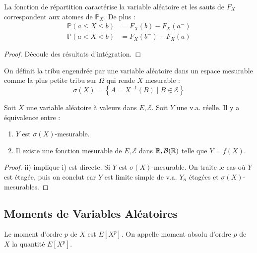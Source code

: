 \documentclass{cours}
\begin{document}
\begin{proposition}
    La fonction de répartition caractérise la variable aléatoire et les sauts de $F_{X}$ correspondent aux atomes de $\mathbb{P}_{X}$. De plus :
    \[
        \begin{aligned}
            \mathbb{P}\left(a \leq X \leq b\right) & = F_{X}(b) - F_{X}(a^{-}) \\
            \mathbb{P}\left(a < X < b\right)       & = F_{X}(b^{-}) - F_{X}(a)
        \end{aligned}
    \]
\end{proposition}
\begin{proof}
    Découle des résultats d'intégration.
\end{proof}

\begin{definition}
    On définit la tribu engendrée par une variable aléatoire dans un espace mesurable comme la plus petite tribu sur $\Omega$ qui rende $X$ mesurable :
    \[
        \sigma(X) = \left\{A = X^{-1}(B)\mid B\in \mathcal{E}\right\}
    \]
\end{definition}

\begin{proposition}
    Soit $X$ une variable aléatoire à valeurs dans $E, \mathcal{E}$. Soit $Y$ une v.a. réelle. Il y a équivalence entre :
    \begin{enumerate}
        \item $Y$ est $\sigma(X)$-mesurable.
        \item Il existe une fonction mesurable de $E, \mathcal{E}$ dans $\mathbb{R}, \mathcal{B}(\mathbb{R})$ telle que $Y = f(X)$.
    \end{enumerate}
\end{proposition}
\begin{proof}
    ii) implique i) est directe. Si $Y$ est $\sigma(X)$-mesurable. On traite le cas où $Y$ est étagée, puis on conclut car $Y$ est limite simple de v.a. $Y_{n}$ étagées et $\sigma(X)$-mesurables.
\end{proof}

\subsection{Moments de Variables Aléatoires}
\begin{definition}
    Le moment d'ordre $p$ de $X$ est $E[X^{p}]$. On appelle moment absolu d'ordre $p$ de $X$ la quantité $E\left[X^{p}\right]$.
\end{definition}
\end{document}
